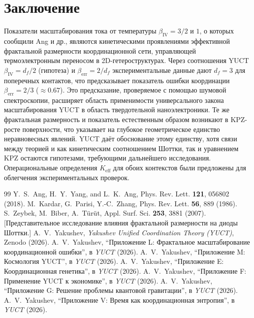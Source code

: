 \documentclass[12pt,a4paper]{article}
\newcommand{\Keff}{K_{\mathrm{eff}}}
\begin{document}
	\section{Заключение}
	Показатели масштабирования тока от температуры $\beta_{\mathrm{IV}} = 3/2$
	и $1$, о которых сообщили Ang и др., являются кинетическими проявлениями
	эффективной фрактальной размерности координационной сети, управляющей
	термоэлектронным переносом в 2D-гетероструктурах. Через соотношения YUCT
	$\beta_{\mathrm{IV}} = d_f/2$ (гипотеза) и $\beta_{\mathrm{err}} = 2/d_f$
	экспериментальные данные дают $d_f = 3$ для поперечных контактов, что
	предсказывает показатель ошибки координации $\beta_{\mathrm{err}} = 2/3$
	($\approx 0.67$). Это предсказание, проверяемое с помощью шумовой
	спектроскопии, расширяет область применимости универсального закона
	масштабирования YUCT в область твердотельной наноэлектроники. Те же
	фрактальная размерность и показатель естественным образом возникают в
	KPZ-росте поверхности, что указывает на глубокое геометрическое единство
	неравновесных явлений. YUCT даёт обоснование этому единству, хотя связи
	между теорией и как кинетическим соотношением Шоттки, так и уравнением
	KPZ остаются гипотезами, требующими дальнейшего исследования.
	Операциональные определения $\Keff$ для обоих контекстов были предложены
	для облегчения экспериментальных проверок.
	
	\begin{thebibliography}{99}
		 Y.~S.~Ang, H.~Y.~Yang, and L.~K.~Ang,
		Phys. Rev. Lett. \textbf{121}, 056802 (2018).
		 M.~Kardar, G.~Parisi, Y.-C.~Zhang,
		Phys. Rev. Lett. \textbf{56}, 889 (1986).
		 S.~Zeybek, M.~Biber, A.~Türüt,
		Appl. Surf. Sci. \textbf{253}, 3881 (2007). [Представительное исследование влияния фрактальной размерности на диоды Шоттки.]
		 A.~V.~Yakushev, \emph{Yakushev Unified Coordination Theory (YUCT)}, Zenodo (2026).
		 A.~V.~Yakushev, ``Приложение L: Фрактальное масштабирование координационной ошибки'', в \emph{YUCT} (2026).
		 A.~V.~Yakushev, ``Приложение M: Космология YUCT'', в \emph{YUCT} (2026).
		 A.~V.~Yakushev, ``Приложение E: Координационная генетика'', в \emph{YUCT} (2026).
		 A.~V.~Yakushev, ``Приложение F: Применение YUCT к экономике'', в \emph{YUCT} (2026).
		 A.~V.~Yakushev, ``Приложение G: Решение проблемы квантовой гравитации'', в \emph{YUCT} (2026).
		 A.~V.~Yakushev, ``Приложение V: Время как координационная энтропия'', в \emph{YUCT} (2026).
	\end{thebibliography}
	
\end{document}
